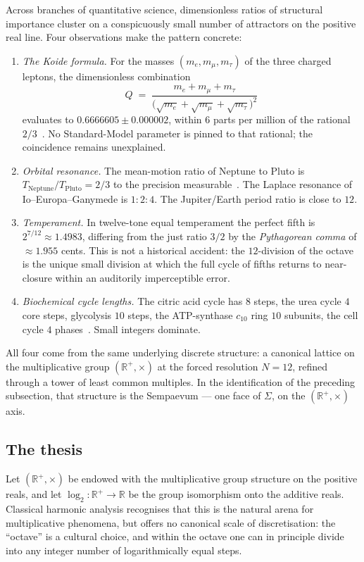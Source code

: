 \documentclass[11pt,a4paper]{article}
\theoremstyle{definition}
\theoremstyle{remark}
\newcommand{\R}{\mathbb{R}}
\begin{document}
Across branches of quantitative science, dimensionless ratios of structural importance cluster on a conspicuously small number of attractors on the positive real line. Four observations make the pattern concrete:

\begin{enumerate}[leftmargin=*]
\item \emph{The Koide formula.} For the masses $(m_e,m_{\mu},m_{\tau})$ of the three charged leptons, the dimensionless combination
\[
Q \;=\; \frac{m_e+m_{\mu}+m_{\tau}}{\bigl(\sqrt{m_e}+\sqrt{m_{\mu}}+\sqrt{m_{\tau}}\bigr)^{2}}
\]
evaluates to $0.6666605\pm 0.000002$, within $6$ parts per million of the rational $2/3$~\cite{Koide1982}. No Standard-Model parameter is pinned to that rational; the coincidence remains unexplained.
\item \emph{Orbital resonance.} The mean-motion ratio of Neptune to Pluto is $T_{\mathrm{Neptune}}/T_{\mathrm{Pluto}}=2/3$ to the precision measurable~\cite{CohenHubbard1965}. The Laplace resonance of Io--Europa--Ganymede is $1{:}2{:}4$. The Jupiter/Earth period ratio is close to $12$.
\item \emph{Temperament.} In twelve-tone equal temperament the perfect fifth is $2^{7/12}\approx 1.4983$, differing from the just ratio $3/2$ by the \emph{Pythagorean comma} of $\approx 1.955$ cents. This is not a historical accident: the $12$-division of the octave is the unique small division at which the full cycle of fifths returns to near-closure within an auditorily imperceptible error.
\item \emph{Biochemical cycle lengths.} The citric acid cycle has $8$ steps, the urea cycle $4$ core steps, glycolysis $10$ steps, the ATP-synthase $c_{10}$ ring $10$ subunits, the cell cycle $4$ phases~\cite{Alberts}. Small integers dominate.
\end{enumerate}

All four come from the same underlying discrete structure: a canonical lattice on the multiplicative group $(\R^{+},\times)$ at the forced resolution $N=12$, refined through a tower of least common multiples. In the identification of the preceding subsection, that structure is the Sempaevum --- one face of $\Sigma$, on the $(\R^{+},\times)$ axis.

\subsection{The thesis}

Let $(\R^{+},\times)$ be endowed with the multiplicative group structure on the positive reals, and let $\log_{2}:\R^{+}\to\R$ be the group isomorphism onto the additive reals. Classical harmonic analysis recognises that this is the natural arena for multiplicative phenomena, but offers no canonical scale of discretisation: the ``octave'' is a cultural choice, and within the octave one can in principle divide into any integer number of logarithmically equal steps.
\end{document}

